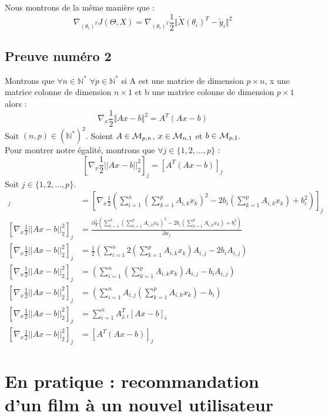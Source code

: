 \documentclass[a4paper,10pt]{article}
\begin{document}
Nous montrons de la même manière que : \[\nabla_{(\theta_{i})^T} J(\Theta, X) = \nabla_{(\theta_{i})^T}\frac{1}{2}\Vert\tilde{X}(\theta_{i})^{T}-\tilde{y}_{i}\Vert^{2}\]
\subsection{Preuve numéro 2}  
\label{P2}
Montrons que $\forall n \in \mathbb{N}^{*}$ $\forall p \in \mathbb{N}^{*}$ si A est une matrice de dimension $p \times n$, x une matrice colonne de dimension $n \times 1$ et b une matrice colonne de dimension $p \times 1$ alors : \[\nabla_{x}\frac{1}{2}\Vert Ax-b \Vert^2 = A^{T}(Ax-b)\]
Soit $(n,p) \in (\mathbb{N}^*)^2$. Soient $A \in {\cal M}_{p, n}$, $x \in {\cal M}_{n, 1}$ et $b \in {\cal M}_{p, 1}$.\\
Pour montrer notre égalité, montrons que $\forall j \in \{1, 2, ..., p\}$ : \[[\nabla_{x} \frac{1}{2}||Ax - b||^{2}_{2}]_{j} = [A^{T}(Ax - b)]_{j}\]
Soit $j \in \{1, 2, ..., p\}$.
\begin{align*}  
[\nabla_{x} \frac{1}{2}||Ax - b||^{2}_{2}]_{j} &= [\nabla_{x} \frac{1}{2}(\sum^{n}_{i = 1} (\sum^{p}_{k = 1} A_{i, k}x_{k})^{2} - 2b_{i}(\sum^{p}_{k = 1} A_{i, k}x_{k}) + b_{i}^{2})]_{j}\\  
[\nabla_{x} \frac{1}{2}||Ax - b||^{2}_{2}]_{j} &= \frac{\partial\frac{1}{2}(\sum^{n}_{i = 1} (\sum^{p}_{k = 1} A_{i, k}x_{k})^{2} - 2b_{i}(\sum^{p}_{k = 1} A_{i, k}x_{k}) + b_{i}^{2})}{\partial x_{j}}\\  
[\nabla_{x} \frac{1}{2}||Ax - b||^{2}_{2}]_{j} &= \frac{1}{2}(\sum^{n}_{i = 1} 2(\sum^{p}_{k = 1} A_{i, k}x_{k})A_{i, j} - 2b_{i} A_{i, j})\\  
[\nabla_{x} \frac{1}{2}||Ax - b||^{2}_{2}]_{j} &= (\sum^{n}_{i = 1} (\sum^{p}_{k = 1} A_{i, k}x_{k})A_{i, j} - b_{i} A_{i, j})\\  
[\nabla_{x} \frac{1}{2}||Ax - b||^{2}_{2}]_{j} &= (\sum^{n}_{i = 1} A_{i, j}(\sum^{p}_{k = 1} A_{i, k}x_{k}) - b_{i} )\\  
[\nabla_{x} \frac{1}{2}||Ax - b||^{2}_{2}]_{j} &= \sum^{n}_{i = 1} A^{T}_{j, i}[Ax - b]_{i}\\  
[\nabla_{x} \frac{1}{2}||Ax - b||^{2}_{2}]_{j} &= [A^{T}(Ax - b)]_{j}  
\end{align*}

\newpage

\section{En pratique : recommandation d'un film à un nouvel utilisateur}
\label{specifique}
\end{document}
